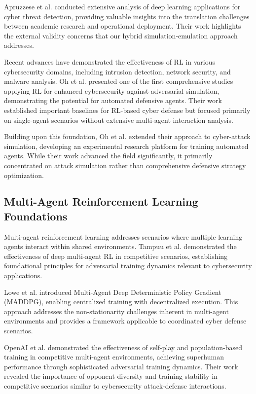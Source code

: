 \documentclass[12pt]{article}
\theoremstyle{definition}
\theoremstyle{plain}
\begin{document}
Apruzzese et al. \cite{apruzzese2022deep} conducted extensive analysis of deep learning applications for cyber threat detection, providing valuable insights into the translation challenges between academic research and operational deployment. Their work highlights the external validity concerns that our hybrid simulation-emulation approach addresses.

Recent advances have demonstrated the effectiveness of RL in various cybersecurity domains, including intrusion detection, network security, and malware analysis. Oh et al. \cite{oh2023applying} presented one of the first comprehensive studies applying RL for enhanced cybersecurity against adversarial simulation, demonstrating the potential for automated defensive agents. Their work established important baselines for RL-based cyber defense but focused primarily on single-agent scenarios without extensive multi-agent interaction analysis.

Building upon this foundation, Oh et al. \cite{oh2024employing} extended their approach to cyber-attack simulation, developing an experimental research platform for training automated agents. While their work advanced the field significantly, it primarily concentrated on attack simulation rather than comprehensive defensive strategy optimization.

\subsection{Multi-Agent Reinforcement Learning Foundations}

Multi-agent reinforcement learning addresses scenarios where multiple learning agents interact within shared environments. Tampuu et al. \cite{tampuu2017multiagent} demonstrated the effectiveness of deep multi-agent RL in competitive scenarios, establishing foundational principles for adversarial training dynamics relevant to cybersecurity applications.

Lowe et al. \cite{lowe2017multi} introduced Multi-Agent Deep Deterministic Policy Gradient (MADDPG), enabling centralized training with decentralized execution. This approach addresses the non-stationarity challenges inherent in multi-agent environments and provides a framework applicable to coordinated cyber defense scenarios.

OpenAI et al. \cite{openai2019dota} demonstrated the effectiveness of self-play and population-based training in competitive multi-agent environments, achieving superhuman performance through sophisticated adversarial training dynamics. Their work revealed the importance of opponent diversity and training stability in competitive scenarios similar to cybersecurity attack-defense interactions.
\end{document}
